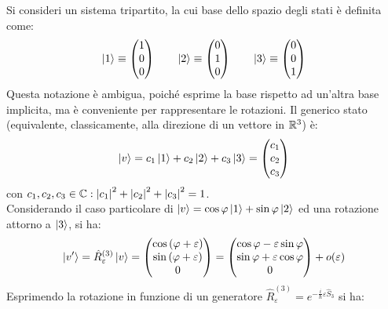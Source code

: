 Si consideri un sistema tripartito, la cui base dello spazio degli stati è definita come:
\begin{equation*}
	\ket{1} \equiv
	\begin{pmatrix}
		1 \\ 0 \\ 0
	\end{pmatrix}
	\qquad
	\ket{2} \equiv
	\begin{pmatrix}
		0 \\ 1 \\ 0
	\end{pmatrix}
	\qquad
	\ket{3} \equiv
	\begin{pmatrix}
		0 \\ 0 \\ 1
	\end{pmatrix}
\end{equation*}
Questa notazione è ambigua, poiché esprime la base rispetto ad un'altra base implicita, ma è conveniente per rappresentare le rotazioni. Il generico stato (equivalente, classicamente, alla direzione di un vettore in $ \mathbb{R}^3 $) è:
\begin{equation}
	\ket{v} = c_1 \ket{1} + c_2 \ket{2} + c_3 \ket{3} =
	\begin{pmatrix}
		c_1 \\ c_2 \\ c_3
	\end{pmatrix}
	\label{eq:2.37}
\end{equation}
con $ c_1,c_2,c_3 \in \mathbb{C} : \left\lvert c_1\right\rvert^2 + \left\lvert c_2\right\rvert^2 + \left\lvert c_3\right\rvert^2 = 1 $.\\
Considerando il caso particolare di $ \ket{v} = \cos \varphi \ket{1} + \sin \varphi \ket{2} $ ed una rotazione attorno a $ \ket{3} $, si ha:
\begin{equation}
	\ket{v'} = \hat{R}_{\varepsilon}^{(3)} \ket{v} =
	\begin{pmatrix}
		\cos \left( \varphi + \varepsilon \right) \\ \sin \left( \varphi + \varepsilon \right) \\ 0
	\end{pmatrix}
	=
	\begin{pmatrix}
		\cos \varphi - \varepsilon \sin \varphi \\ \sin \varphi + \varepsilon \cos \varphi \\ 0
	\end{pmatrix}
	+ o(\varepsilon)
	\label{eq:2.38}
\end{equation}
Esprimendo la rotazione in funzione di un generatore $ \hat{R}_{\varepsilon}^{(3)} = e^{-\frac{i}{\hbar} \varepsilon \hat{S}_3} $ si ha:
